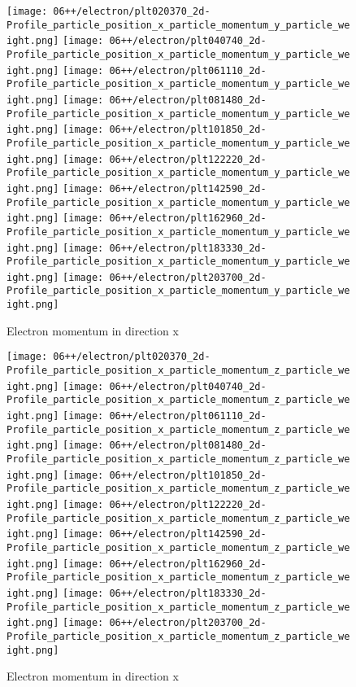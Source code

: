 \begin{figure}
  \centering
  {\texttt{[image: 06++/electron/plt020370\_2d-Profile\_particle\_position\_x\_particle\_momentum\_y\_particle\_weight.png]}}
  {\texttt{[image: 06++/electron/plt040740\_2d-Profile\_particle\_position\_x\_particle\_momentum\_y\_particle\_weight.png]}}
  {\texttt{[image: 06++/electron/plt061110\_2d-Profile\_particle\_position\_x\_particle\_momentum\_y\_particle\_weight.png]}}
  {\texttt{[image: 06++/electron/plt081480\_2d-Profile\_particle\_position\_x\_particle\_momentum\_y\_particle\_weight.png]}}
  {\texttt{[image: 06++/electron/plt101850\_2d-Profile\_particle\_position\_x\_particle\_momentum\_y\_particle\_weight.png]}}
  {\texttt{[image: 06++/electron/plt122220\_2d-Profile\_particle\_position\_x\_particle\_momentum\_y\_particle\_weight.png]}}
  {\texttt{[image: 06++/electron/plt142590\_2d-Profile\_particle\_position\_x\_particle\_momentum\_y\_particle\_weight.png]}}
  {\texttt{[image: 06++/electron/plt162960\_2d-Profile\_particle\_position\_x\_particle\_momentum\_y\_particle\_weight.png]}}
  {\texttt{[image: 06++/electron/plt183330\_2d-Profile\_particle\_position\_x\_particle\_momentum\_y\_particle\_weight.png]}}
  {\texttt{[image: 06++/electron/plt203700\_2d-Profile\_particle\_position\_x\_particle\_momentum\_y\_particle\_weight.png]}}
  \caption{Electron momentum in direction x}\label{fig:06++_e_vy}
\end{figure}

\begin{figure}
  \centering
  {\texttt{[image: 06++/electron/plt020370\_2d-Profile\_particle\_position\_x\_particle\_momentum\_z\_particle\_weight.png]}}
  {\texttt{[image: 06++/electron/plt040740\_2d-Profile\_particle\_position\_x\_particle\_momentum\_z\_particle\_weight.png]}}
  {\texttt{[image: 06++/electron/plt061110\_2d-Profile\_particle\_position\_x\_particle\_momentum\_z\_particle\_weight.png]}}
  {\texttt{[image: 06++/electron/plt081480\_2d-Profile\_particle\_position\_x\_particle\_momentum\_z\_particle\_weight.png]}}
  {\texttt{[image: 06++/electron/plt101850\_2d-Profile\_particle\_position\_x\_particle\_momentum\_z\_particle\_weight.png]}}
  {\texttt{[image: 06++/electron/plt122220\_2d-Profile\_particle\_position\_x\_particle\_momentum\_z\_particle\_weight.png]}}
  {\texttt{[image: 06++/electron/plt142590\_2d-Profile\_particle\_position\_x\_particle\_momentum\_z\_particle\_weight.png]}}
  {\texttt{[image: 06++/electron/plt162960\_2d-Profile\_particle\_position\_x\_particle\_momentum\_z\_particle\_weight.png]}}
  {\texttt{[image: 06++/electron/plt183330\_2d-Profile\_particle\_position\_x\_particle\_momentum\_z\_particle\_weight.png]}}
  {\texttt{[image: 06++/electron/plt203700\_2d-Profile\_particle\_position\_x\_particle\_momentum\_z\_particle\_weight.png]}}
  \caption{Electron momentum in direction x}\label{fig:06++_e_vz}
\end{figure}


